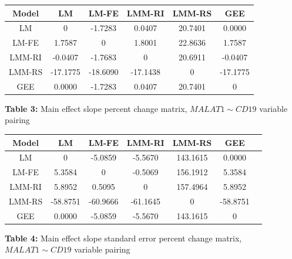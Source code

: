 \documentclass[12pt,]{article}
\begin{document}
\begin{center}
\begin{tabular}{|c||c|c|c|c|c|}
\hline
Model & LM & LM-FE & LMM-RI & LMM-RS & GEE \\
\hline
\hline
LM & 0 &  -1.7283 &  0.0407 & 20.7401 &  0.0000 \\
\hline
LM-FE & 1.7587 &  0 &  1.8001 & 22.8636  & 1.7587  \\      
\hline
LMM-RI & -0.0407 & -1.7683 &  0 & 20.6911 & -0.0407  \\
\hline
LMM-RS & -17.1775 & -18.6090 & -17.1438 & 0 & -17.1775 \\
\hline
GEE & 0.0000 & -1.7283  & 0.0407 & 20.7401  & 0 \\
\hline
\end{tabular}

\vspace{5pt}

\textbf{Table 3:} Main effect slope percent change matrix, $MALAT1 \sim CD19$ variable pairing
\end{center}

\vspace{20pt}

\begin{center}
\begin{tabular}{|c||c|c|c|c|c|c|}
\hline
Model & LM & LM-FE & LMM-RI & LMM-RS & GEE \\
\hline
\hline
LM & 0   & -5.0859  & -5.5670   & 143.1615  & 0.0000  \\
\hline
LM-FE & 5.3584   & 0   & -0.5069   & 156.1912  & 5.3584  \\     
\hline
LMM-RI & 5.8952   & 0.5095   & 0    & 157.4964  & 5.8952  \\
\hline
LMM-RS & -58.8751 & -60.9666 & -61.1645  & 0    & -58.8751  \\
\hline
GEE &  0.0000   & -5.0859  & -5.5670   & 143.1615  & 0        \\
\hline
\end{tabular}

\vspace{5pt}

\textbf{Table 4:} Main effect slope standard error percent change matrix, $MALAT1 \sim CD19$ variable pairing
\end{center}

\vspace{20pt}
\end{document}
